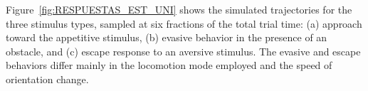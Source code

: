 
Figure~\ref{fig:RESPUESTAS_EST_UNI} shows the simulated trajectories for the three stimulus types, sampled at six fractions of the total trial time: (a) approach toward the appetitive stimulus, (b) evasive behavior in the presence of an obstacle, and (c) escape response to an aversive stimulus. The evasive and escape behaviors differ mainly in the locomotion mode employed and the speed of orientation change.
